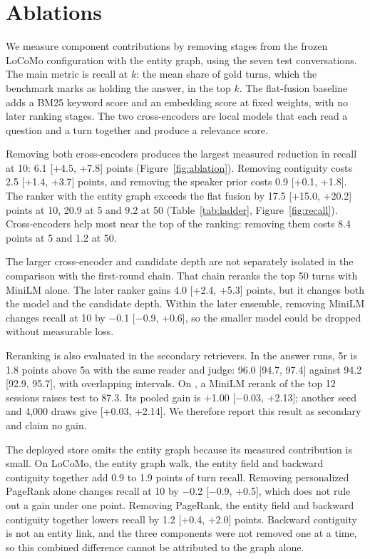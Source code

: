 \section{Ablations}
\label{sec:ablations}

We measure component contributions by removing stages from the frozen LoCoMo configuration with the entity graph, using the seven test conversations. The main metric is recall at $k$: the mean share of gold turns, which the benchmark marks as holding the answer, in the top $k$. The flat-fusion baseline adds a BM25 keyword score and an embedding score at fixed weights, with no later ranking stages. The two cross-encoders are local models that each read a question and a turn together and produce a relevance score.

Removing both cross-encoders produces the largest measured reduction in recall at 10: 6.1 [+4.5, +7.8] points (Figure~\ref{fig:ablation}). Removing contiguity costs 2.5 [+1.4, +3.7] points, and removing the speaker prior costs 0.9 [+0.1, +1.8]. The ranker with the entity graph exceeds the flat fusion by 17.5 [+15.0, +20.2] points at 10, 20.9 at 5 and 9.2 at 50 (Table~\ref{tab:ladder}, Figure~\ref{fig:recall}). Cross-encoders help most near the top of the ranking: removing them costs 8.4 points at 5 and 1.2 at 50.

The larger cross-encoder and candidate depth are not separately isolated in the comparison with the first-round chain. That chain reranks the top 50 turns with MiniLM alone. The later ranker gains 4.0 [+2.4, +5.3] points, but it changes both the model and the candidate depth. Within the later ensemble, removing MiniLM changes recall at 10 by $-$0.1 [$-$0.9, +0.6], so the smaller model could be dropped without measurable loss.

Reranking is also evaluated in the secondary retrievers. In the answer runs, 5r is 1.8 points above 5a with the same reader and judge: 96.0 [94.7, 97.4] against 94.2 [92.9, 95.7], with overlapping intervals. On \lmes{}, a MiniLM rerank of the top 12 sessions raises test  to 87.3. Its pooled gain is +1.00 [$-$0.03, +2.13]; another seed and 4,000 draws give [+0.03, +2.14]. We therefore report this result as secondary and claim no gain.

The deployed store omits the entity graph because its measured contribution is small. On LoCoMo, the entity graph walk, the entity field and backward contiguity together add 0.9 to 1.9 points of turn recall. Removing personalized PageRank alone changes recall at 10 by $-$0.2 [$-$0.9, +0.5], which does not rule out a gain under one point. Removing PageRank, the entity field and backward contiguity together lowers recall by 1.2 [+0.4, +2.0] points. Backward contiguity is not an entity link, and the three components were not removed one at a time, so this combined difference cannot be attributed to the graph alone.

